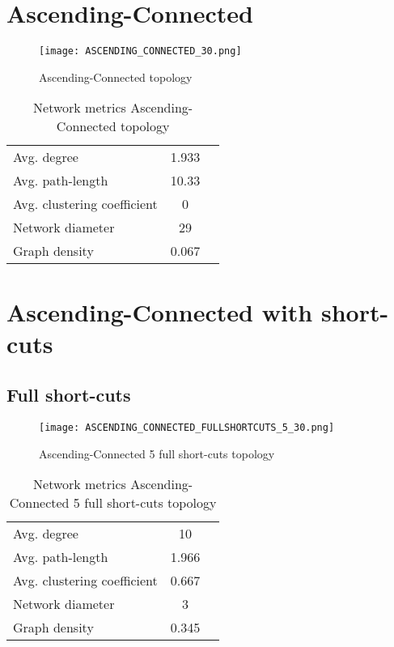 \documentclass[Bachelorarbeit.tex]{subfiles}
\begin{document}
\section{Ascending-Connected}
\begin{figure}[H]
	\centering
  \texttt{[image: ASCENDING\_CONNECTED\_30.png]}
	\caption{Ascending-Connected topology}
	\label{fig:topology_ASCENDING_CONNECTED_30}
\end{figure}

\begin{table}[h]
	\centering
	\caption{Network metrics Ascending-Connected topology}
	\begin{tabular} { l c r }
		\hline
		Avg. degree & 1.933 \\
		Avg. path-length & 10.33 \\
		Avg. clustering coefficient & 0 \\
		Network diameter & 29 \\
		Graph density & 0.067 \\
		\hline
	\end{tabular}
\end{table}

\section{Ascending-Connected with short-cuts}
\subsection{Full short-cuts}
\begin{figure}[H]
	\centering
  \texttt{[image: ASCENDING\_CONNECTED\_FULLSHORTCUTS\_5\_30.png]}
	\caption{Ascending-Connected 5 full short-cuts topology}
	\label{fig:topology_ASCENDING_CONNECTED_FULLSHORTCUTS_5_30}
\end{figure}

\begin{table}[h]
	\centering
	\caption{Network metrics Ascending-Connected 5 full short-cuts topology}
	\begin{tabular} { l c r }
		\hline
		Avg. degree & 10 \\
		Avg. path-length & 1.966 \\
		Avg. clustering coefficient & 0.667 \\
		Network diameter & 3 \\
		Graph density & 0.345 \\
		\hline
	\end{tabular}
\end{table}
\end{document}
